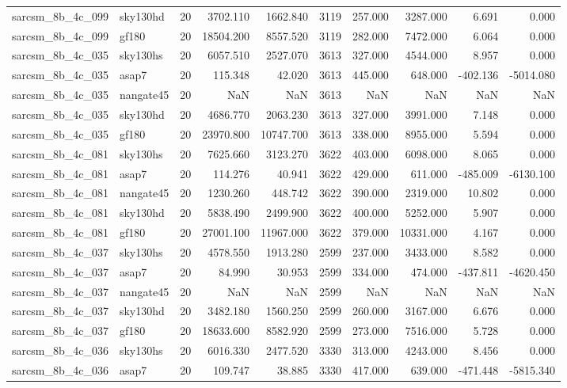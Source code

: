 \begin{tabular}{llrrrrrrrr}
sarcsm\_8b\_4c\_099 & sky130hd & 20 & 3702.110 & 1662.840 & 3119 & 257.000 & 3287.000 & 6.691 & 0.000 \\
sarcsm\_8b\_4c\_099 & gf180 & 20 & 18504.200 & 8557.520 & 3119 & 282.000 & 7472.000 & 6.064 & 0.000 \\
sarcsm\_8b\_4c\_035 & sky130hs & 20 & 6057.510 & 2527.070 & 3613 & 327.000 & 4544.000 & 8.957 & 0.000 \\
sarcsm\_8b\_4c\_035 & asap7 & 20 & 115.348 & 42.020 & 3613 & 445.000 & 648.000 & -402.136 & -5014.080 \\
sarcsm\_8b\_4c\_035 & nangate45 & 20 & NaN & NaN & 3613 & NaN & NaN & NaN & NaN \\
sarcsm\_8b\_4c\_035 & sky130hd & 20 & 4686.770 & 2063.230 & 3613 & 327.000 & 3991.000 & 7.148 & 0.000 \\
sarcsm\_8b\_4c\_035 & gf180 & 20 & 23970.800 & 10747.700 & 3613 & 338.000 & 8955.000 & 5.594 & 0.000 \\
sarcsm\_8b\_4c\_081 & sky130hs & 20 & 7625.660 & 3123.270 & 3622 & 403.000 & 6098.000 & 8.065 & 0.000 \\
sarcsm\_8b\_4c\_081 & asap7 & 20 & 114.276 & 40.941 & 3622 & 429.000 & 611.000 & -485.009 & -6130.100 \\
sarcsm\_8b\_4c\_081 & nangate45 & 20 & 1230.260 & 448.742 & 3622 & 390.000 & 2319.000 & 10.802 & 0.000 \\
sarcsm\_8b\_4c\_081 & sky130hd & 20 & 5838.490 & 2499.900 & 3622 & 400.000 & 5252.000 & 5.907 & 0.000 \\
sarcsm\_8b\_4c\_081 & gf180 & 20 & 27001.100 & 11967.000 & 3622 & 379.000 & 10331.000 & 4.167 & 0.000 \\
sarcsm\_8b\_4c\_037 & sky130hs & 20 & 4578.550 & 1913.280 & 2599 & 237.000 & 3433.000 & 8.582 & 0.000 \\
sarcsm\_8b\_4c\_037 & asap7 & 20 & 84.990 & 30.953 & 2599 & 334.000 & 474.000 & -437.811 & -4620.450 \\
sarcsm\_8b\_4c\_037 & nangate45 & 20 & NaN & NaN & 2599 & NaN & NaN & NaN & NaN \\
sarcsm\_8b\_4c\_037 & sky130hd & 20 & 3482.180 & 1560.250 & 2599 & 260.000 & 3167.000 & 6.676 & 0.000 \\
sarcsm\_8b\_4c\_037 & gf180 & 20 & 18633.600 & 8582.920 & 2599 & 273.000 & 7516.000 & 5.728 & 0.000 \\
sarcsm\_8b\_4c\_036 & sky130hs & 20 & 6016.330 & 2477.520 & 3330 & 313.000 & 4243.000 & 8.456 & 0.000 \\
sarcsm\_8b\_4c\_036 & asap7 & 20 & 109.747 & 38.885 & 3330 & 417.000 & 639.000 & -471.448 & -5815.340 \\

\end{tabular}
